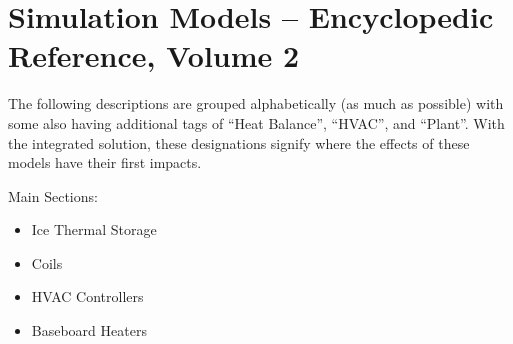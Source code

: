 \chapter{Simulation Models -- Encyclopedic Reference, Volume 2}\label{simulation-models---encyclopedic-reference-001}

The following descriptions are grouped alphabetically (as much as possible) with some also having additional tags of ``Heat Balance'', ``HVAC'', and ``Plant''. With the integrated solution, these designations signify where the effects of these models have their first impacts.

Main Sections:

\begin{itemize}
  \tightlist
  \item Ice Thermal Storage
  \item Coils
  \item HVAC Controllers
  \item Baseboard Heaters
\end{itemize}
